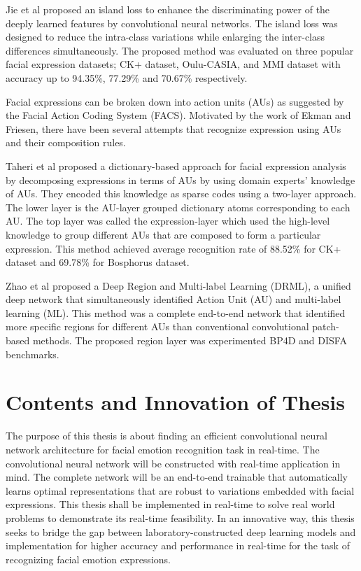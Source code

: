\documentclass[master]{thesis-uestc}
\begin{document}
Jie et al proposed an island loss to enhance the discriminating power of the deeply learned features by convolutional neural networks. The island loss was designed to reduce the intra-class variations while enlarging the inter-class differences simultaneously. The proposed method was evaluated on three popular facial expression datasets; CK+ dataset, Oulu-CASIA, and MMI dataset with accuracy up to 94.35\%, 77.29\% and 70.67\% respectively.

Facial expressions can be broken down into action units (AUs) as suggested by the Facial Action Coding System (FACS). Motivated by the work of Ekman and Friesen, there have been several attempts that recognize expression using AUs and their composition rules.

Taheri et al proposed a dictionary-based approach for facial expression analysis by decomposing expressions in terms of AUs by using domain experts’ knowledge of AUs. They encoded this knowledge as sparse codes using a two-layer approach. The lower layer is the AU-layer grouped dictionary atoms corresponding to each AU. The top layer was called the expression-layer which used the high-level knowledge to group different AUs that are composed to form a particular expression. This method achieved average recognition rate of 88.52\% for CK+ dataset and 69.78\% for Bosphorus dataset.

Zhao et al proposed a Deep Region and Multi-label Learning (DRML), a unified deep network that simultaneously identified Action Unit (AU) and multi-label learning (ML). This method was a complete end-to-end network that identified more specific regions for different AUs than conventional convolutional patch-based methods. The proposed region layer was experimented BP4D  and DISFA benchmarks.

\section{Contents and Innovation of Thesis}
The purpose of this thesis is about finding an efficient convolutional neural network architecture for facial emotion recognition task in real-time. The convolutional neural network will be constructed with real-time application in mind. The complete network will be an end-to-end trainable that automatically learns optimal representations that are robust to variations embedded with facial expressions. This thesis shall be implemented in real-time to solve real world problems to demonstrate its real-time feasibility. In an innovative way, this thesis seeks to bridge the gap between laboratory-constructed deep learning models and implementation for higher accuracy and performance in real-time for the task of recognizing facial emotion expressions.
\end{document}
